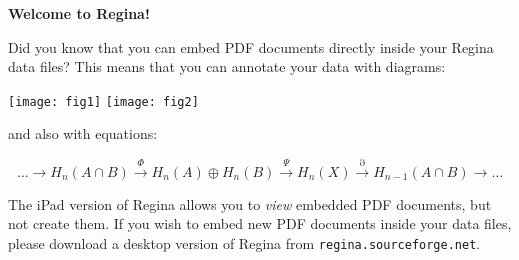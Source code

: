 \documentclass[a4paper,10pt]{article}
\begin{document}
\thispagestyle{empty}
\centerline{\large \bf{Welcome to Regina!}}

\bigskip

Did you know that you can embed PDF documents directly inside your
Regina data files?
This means that you can annotate your data with diagrams:

\bigskip

\centerline{
    \texttt{[image: fig1]}\qquad\qquad
    \texttt{[image: fig2]}}

\medskip

\noindent
and also with equations:

\[ \ldots
    \longrightarrow H_n(A \cap B)
    \stackrel{\Phi}{\longrightarrow} H_n(A) \oplus H_n(B)
    \stackrel{\Psi}{\longrightarrow} H_n(X)
    \stackrel{\partial}{\longrightarrow} H_{n-1}(A \cap B)
    \longrightarrow \ldots
\]

The iPad version of Regina allows you to \emph{view} embedded PDF documents,
but not create them.
If you wish to embed new PDF documents inside your data files,
please download a desktop version of Regina from
\texttt{regina.sourceforge.net}.
\end{document}
